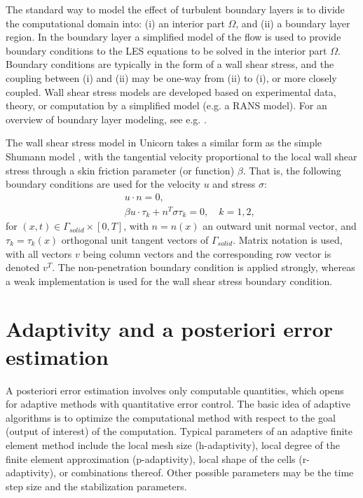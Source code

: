 The standard way to model the effect of turbulent boundary layers is to divide the computational domain into: (i) an interior part $\Omega$, and (ii) a boundary layer region. In the boundary layer a simplified model of the flow is used to provide boundary conditions to the LES equations to be solved in the interior part $\Omega$. Boundary conditions are typically in the form of a wall shear stress, and the coupling between (i) and (ii) may be one-way from (ii) to (i), or more closely coupled. Wall shear stress models are developed based on experimental data, theory, or computation by a simplified model (e.g. a RANS model). For an overview of boundary layer modeling, see e.g. \cite{SagautDeckTerracol2006,PiomelliBalaras2002}.

The wall shear stress model in Unicorn takes a similar form as the simple Shumann model \cite{Schumann1975}, with the tangential velocity proportional to the local wall shear stress through a skin friction parameter (or function) $\beta$. That is, the following boundary conditions are used for the velocity $u$ and stress $\sigma$:
\begin{eqnarray}
&&u\cdot n=0, \label{slfra} \\
&&\beta u\cdot \tau _k + n^T\sigma \tau _k=0,\quad k=1,2, \label{slfrb}
\end{eqnarray}
for  $(x,t)\in \Gamma_{solid}\times [0,T]$, with $n=n(x)$ an outward unit normal vector, and $\tau_k=\tau_k(x)$ orthogonal unit tangent vectors of $\Gamma_{solid}$. Matrix notation is used, with all vectors $v$ being column vectors and the corresponding row vector is denoted $v^T$. The non-penetration boundary condition is applied strongly, whereas a weak implementation is used for the wall shear stress boundary condition.

\section{Adaptivity and a posteriori error estimation}

A posteriori error estimation involves only computable quantities, which opens for adaptive methods with quantitative error control. The basic idea of adaptive algorithms is to optimize the computational method with respect to the goal (output of interest) of the computation. Typical parameters of an adaptive finite element method include the local mesh size (h-adaptivity), local degree of the finite element approximation (p-adaptivity), local shape of the cells (r-adaptivity), or combinations thereof. Other possible parameters may be the time step size and the stabilization parameters.

